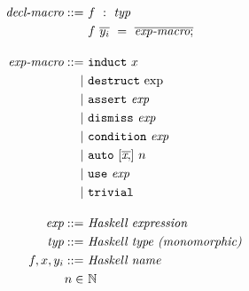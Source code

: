 \begin{align*}
  \textit{decl-macro} ::= &
    ~ f ~ : ~ \textit{typ} \\ &
    ~ f ~ \overline{y_i} ~ = ~ \overline{\textit{exp-macro} ;}
  \\[1em]
  \textit{exp-macro} ::= &
    ~ \mathtt{induct} ~ x \\ \mid &
    ~ \mathtt{destruct} ~ \text{exp} \\ \mid &
    ~ \mathtt{assert} ~ \textit{exp} \\ \mid &
    ~ \mathtt{dismiss} ~ \textit{exp} \\ \mid &
    ~ \mathtt{condition} ~ \textit{exp} \\ \mid &
    ~ \mathtt{auto} ~ [\overline{\textit{x} ,}] ~ n \\ \mid &
    ~ \mathtt{use} ~ \textit{exp} \\ \mid &
    ~ \mathtt{trivial}
  \\[1em]
  \textit{exp} ::= & ~ \textit{Haskell expression} 
  \\
  \textit{typ} ::= & ~ \textit{Haskell type (monomorphic)} 
  \\
  f, x, y_i ::= & ~ \textit{Haskell name} 
  \\
  n \in & ~ \mathbb{N}
\end{align*}

